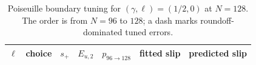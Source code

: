 \begin{table}[htbp]

\centering
\caption{Poiseuille boundary tuning for $(\gamma,\ell)=(1/2,0)$ at $N=128$.  The order is from $N=96$ to $128$; a dash marks roundoff-dominated tuned errors.}
\label{tab:numerical-poiseuille-tuning}
\begingroup
\scriptsize
\setlength{\tabcolsep}{3.7pt}
\begin{tabular}{@{}clrrrrr@{}}
\toprule
$\ell$ & choice & $s_{+}$ & $E_{u,2}$ & $p_{96\to128}$ & fitted slip & predicted slip\\
\midrule
\bottomrule
\end{tabular}
\endgroup
\end{table}
